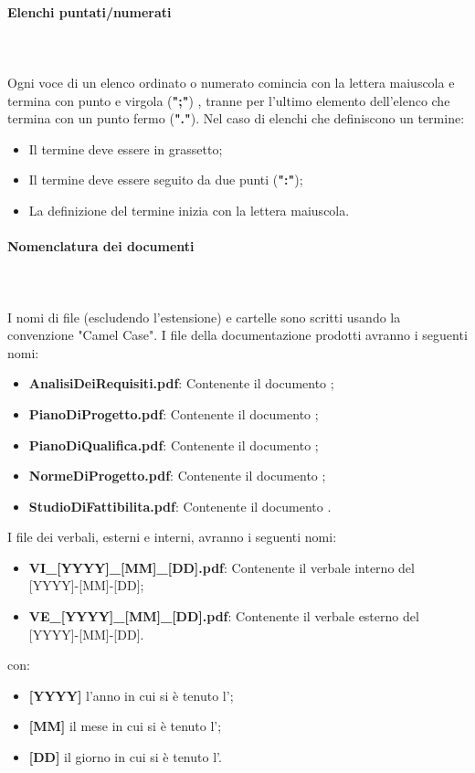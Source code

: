 \paragraph{Elenchi puntati/numerati}\mbox{} \\ \\
Ogni voce di un elenco ordinato o numerato comincia con la lettera maiuscola e termina con punto e virgola (\textbf{";"}) , tranne per l'ultimo elemento dell'elenco che termina con un punto fermo (\textbf{"."}).
Nel caso di elenchi che definiscono un termine:
\begin{itemize}
    \item Il termine deve essere in grassetto;
    \item Il termine deve essere seguito da due punti (\textbf{":"});
    \item La definizione del termine inizia con la lettera maiuscola.
\end{itemize}

\paragraph{Nomenclatura dei documenti}\mbox{} \\ \\
I nomi di file (escludendo l'estensione) e cartelle sono scritti usando la convenzione "Camel Case".
I file della documentazione prodotti avranno i seguenti nomi:
\begin{itemize}
    \item \textbf{AnalisiDeiRequisiti.pdf}: Contenente il documento \AdR{};
    \item \textbf{PianoDiProgetto.pdf}: Contenente il documento \PdP{};
    \item \textbf{PianoDiQualifica.pdf}: Contenente il documento \PdQ{};
    \item \textbf{NormeDiProgetto.pdf}: Contenente il documento \NdP{};
    \item \textbf{StudioDiFattibilita.pdf}: Contenente il documento \SdF{}.
\end{itemize}
I file dei verbali, esterni e interni, avranno i seguenti nomi:
\begin{itemize}
    \item \textbf{VI\_[YYYY]\_[MM]\_[DD].pdf}: Contenente il verbale interno del [YYYY]-[MM]-[DD];
    \item \textbf{VE\_[YYYY]\_[MM]\_[DD].pdf}: Contenente il verbale esterno del [YYYY]-[MM]-[DD].
\end{itemize}
con:
\begin{itemize}
    \item \textbf{[YYYY]} l'anno in cui si è tenuto l';
    \item \textbf{[MM]} il mese in cui si è tenuto l';
    \item \textbf{[DD]} il giorno in cui si è tenuto l'.
\end{itemize}

